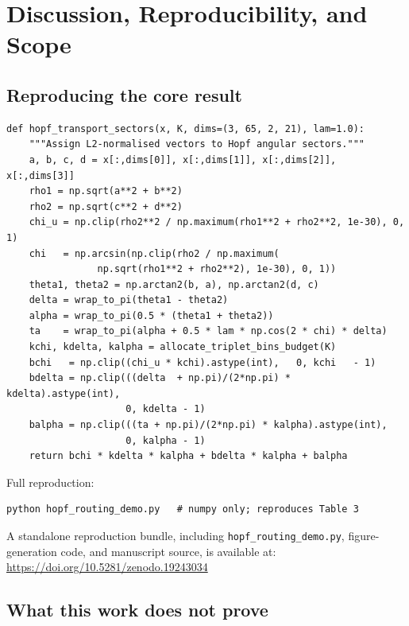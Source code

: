 \documentclass[11pt]{article}
\begin{document}
\section{Discussion, Reproducibility, and Scope}

\subsection{Reproducing the core result}

\begin{lstlisting}[caption={Core routing function (numpy only, $<60$~s to reproduce Table~\ref{tab:scaling}).},
                   label={lst:routing}]
def hopf_transport_sectors(x, K, dims=(3, 65, 2, 21), lam=1.0):
    """Assign L2-normalised vectors to Hopf angular sectors."""
    a, b, c, d = x[:,dims[0]], x[:,dims[1]], x[:,dims[2]], x[:,dims[3]]
    rho1 = np.sqrt(a**2 + b**2)
    rho2 = np.sqrt(c**2 + d**2)
    chi_u = np.clip(rho2**2 / np.maximum(rho1**2 + rho2**2, 1e-30), 0, 1)
    chi   = np.arcsin(np.clip(rho2 / np.maximum(
                np.sqrt(rho1**2 + rho2**2), 1e-30), 0, 1))
    theta1, theta2 = np.arctan2(b, a), np.arctan2(d, c)
    delta = wrap_to_pi(theta1 - theta2)
    alpha = wrap_to_pi(0.5 * (theta1 + theta2))
    ta    = wrap_to_pi(alpha + 0.5 * lam * np.cos(2 * chi) * delta)
    kchi, kdelta, kalpha = allocate_triplet_bins_budget(K)
    bchi   = np.clip((chi_u * kchi).astype(int),   0, kchi   - 1)
    bdelta = np.clip(((delta  + np.pi)/(2*np.pi) * kdelta).astype(int),
                     0, kdelta - 1)
    balpha = np.clip(((ta + np.pi)/(2*np.pi) * kalpha).astype(int),
                     0, kalpha - 1)
    return bchi * kdelta * kalpha + bdelta * kalpha + balpha
\end{lstlisting}

Full reproduction:
\begin{verbatim}
python hopf_routing_demo.py   # numpy only; reproduces Table 3
\end{verbatim}

A standalone reproduction bundle, including \texttt{hopf\_routing\_demo.py},
figure-generation code, and manuscript source, is available at:
\url{https://doi.org/10.5281/zenodo.19243034}

\subsection{What this work does not prove}
\end{document}
